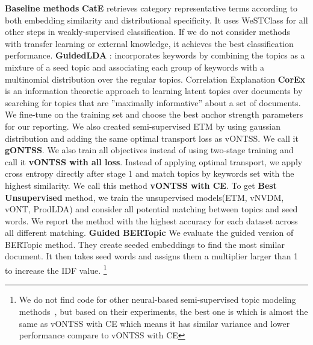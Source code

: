 \documentclass[11pt]{article}
\begin{document}
\textbf{Baseline methods}
\textbf{CatE} \cite{Meng2020DiscriminativeTM}  retrieves category representative terms according to both embedding similarity and distributional specificity. It uses WeSTClass\cite{Meng_2018} for all other steps in weakly-supervised classification. If we do not consider methods with transfer learning or external knowledge, it achieves the best classification performance. \textbf{GuidedLDA} \cite{jagarlamudi-etal-2012-incorporating}: incorporates keywords by combining the topics as a mixture of a seed topic and associating each group of keywords with a multinomial distribution over the regular topics. Correlation Explanation \textbf{CorEx} \cite{gallagher2018anchored} is an information theoretic approach to learning latent topics over documents by searching for topics that are ”maximally informative” about a set of documents. We fine-tune on the training set and choose the best anchor strength parameters for our reporting. We also created semi-supervised ETM by using gaussian distribution and adding the same optimal transport loss as vONTSS. We call it \textbf{gONTSS}. We also train all objectives instead of using two-stage training and call it \textbf{vONTSS with all loss}. Instead of applying optimal transport, we apply cross entropy directly after stage 1 and match topics by keywords set with the highest similarity. We call this method \textbf{vONTSS with CE}. 
To get \textbf{Best Unsupervised} method, we train the unsupervised models(ETM, vNVDM, vONT, ProdLDA) and consider all potential matching between topics and seed words. We report the method with the highest accuracy for each dataset across all different matching. \textbf{Guided BERTopic} We evaluate the guided version of BERTopic \cite{https://doi.org/10.48550/arxiv.2203.05794} method. They create seeded embeddings to find the most similar document. It then takes seed words and assigns them a multiplier larger than 1 to increase the IDF value.  \footnote{We do not find code for other neural-based semi-supervised topic modeling methods~\cite{gemp2019weakly,wang2021neural,Harandizadeh_2022}, but based on their experiments, the best one is \cite{Harandizadeh_2022} which is almost the same as vONTSS with CE which means it has similar variance and lower performance compare to vONTSS with CE  }
\end{document}
